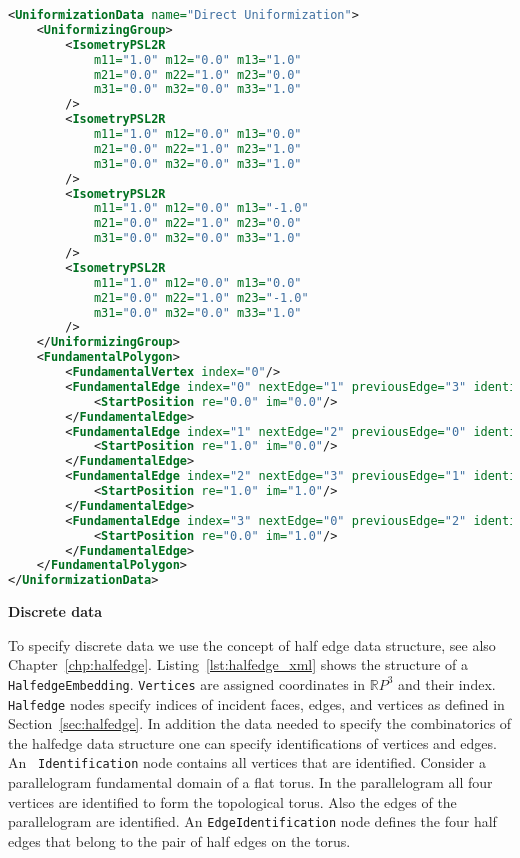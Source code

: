 \documentclass[Thesis.tex]{subfiles}
\begin{document}
\begin{lstlisting}[label=lst:fuchsian_xml, caption={A torus given by its Fuchsian uniformizing group and a corresponding fundamental polygon. The elements of the group are either euclidean motions or hyperbolic motions given as elements of $PSL(2, \mathbb R)$.}, numbers=none, language=XML, captionpos=b]
<UniformizationData name="Direct Uniformization">
	<UniformizingGroup>
		<IsometryPSL2R 
			m11="1.0" m12="0.0" m13="1.0" 
			m21="0.0" m22="1.0" m23="0.0" 
			m31="0.0" m32="0.0" m33="1.0"
		/>
		<IsometryPSL2R 
			m11="1.0" m12="0.0" m13="0.0" 
			m21="0.0" m22="1.0" m23="1.0" 
			m31="0.0" m32="0.0" m33="1.0"
		/>
		<IsometryPSL2R 
			m11="1.0" m12="0.0" m13="-1.0" 
			m21="0.0" m22="1.0" m23="0.0" 
			m31="0.0" m32="0.0" m33="1.0"
		/>
		<IsometryPSL2R 
			m11="1.0" m12="0.0" m13="0.0" 
			m21="0.0" m22="1.0" m23="-1.0" 
			m31="0.0" m32="0.0" m33="1.0"
		/>
	</UniformizingGroup>
	<FundamentalPolygon>
		<FundamentalVertex index="0"/>
		<FundamentalEdge index="0" nextEdge="1" previousEdge="3" identifiedEdge="2" startVertex="0">
			<StartPosition re="0.0" im="0.0"/>
		</FundamentalEdge>
		<FundamentalEdge index="1" nextEdge="2" previousEdge="0" identifiedEdge="3" startVertex="0">
			<StartPosition re="1.0" im="0.0"/>
		</FundamentalEdge>
		<FundamentalEdge index="2" nextEdge="3" previousEdge="1" identifiedEdge="0" startVertex="0">
			<StartPosition re="1.0" im="1.0"/>
		</FundamentalEdge>
		<FundamentalEdge index="3" nextEdge="0" previousEdge="2" identifiedEdge="1" startVertex="0">
			<StartPosition re="0.0" im="1.0"/>
		</FundamentalEdge>
	</FundamentalPolygon>
</UniformizationData>
\end{lstlisting}

{\bf Discrete data} 

To specify discrete data we use the concept of half edge data structure, see
also Chapter~\ref{chp:halfedge}. Listing~\ref{lst:halfedge_xml} shows the
structure of a {\tt HalfedgeEmbedding}. {\tt Vertices} are assigned coordinates
in $\mathbb RP^3$ and their index. {\tt Halfedge} nodes specify indices of
incident faces, edges, and vertices as defined in Section~\ref{sec:halfedge}.
In addition the data needed to specify the combinatorics of the halfedge
data structure one can specify identifications of vertices and edges. An {\tt
Identification} node contains all vertices that are identified. Consider a
parallelogram fundamental domain of a flat torus. In the parallelogram all four
vertices are identified to form the topological torus. Also the edges of the
parallelogram are identified. An {\tt EdgeIdentification} node defines the four
half edges that belong to the pair of half edges on the torus.
\end{document}
